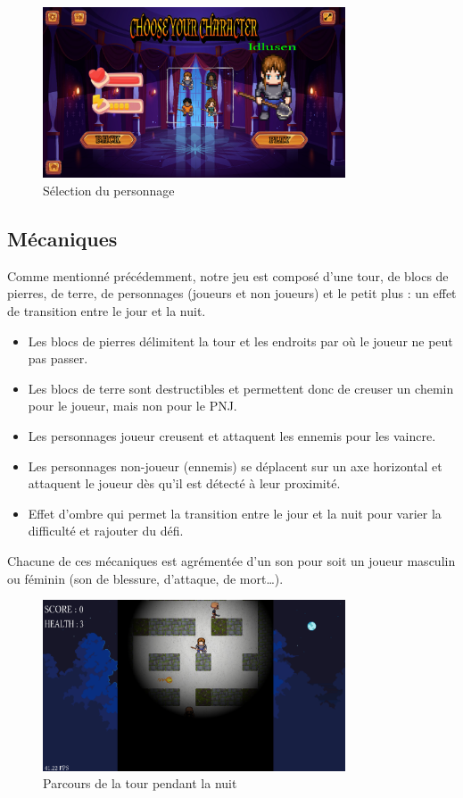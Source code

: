 \documentclass[a4paper,12pt]{article}
\begin{document}
\begin{figure}[H]
	\centering
	\includegraphics[width=0.8\textwidth]{img/ecran_selection.png}
	\caption{Sélection du personnage}
	\label{selection_personnage}
\end{figure}

\subsection{Mécaniques}
Comme mentionné précédemment, notre jeu est composé d'une tour, de blocs de pierres, de terre, de personnages (joueurs et non joueurs) et le petit plus : un effet de transition entre le jour et la nuit.
\begin{itemize}
	\item Les blocs de pierres délimitent la tour et les endroits par où le joueur ne peut pas passer.
	\item Les blocs de terre sont destructibles et permettent donc de creuser un chemin pour le joueur, mais non pour le PNJ.
	\item Les personnages joueur creusent et attaquent les ennemis pour les vaincre.
	\item Les personnages non-joueur (ennemis) se déplacent sur un axe horizontal et attaquent le joueur dès qu'il est détecté à leur proximité.
	\item Effet d'ombre qui permet la transition entre le jour et la nuit pour varier la difficulté et rajouter du défi.
\end{itemize}

Chacune de ces mécaniques est agrémentée d'un son pour soit un joueur masculin ou féminin (son de blessure, d'attaque, de mort\dots).

\begin{figure}[H]
	\centering
	\includegraphics[width=0.8\textwidth]{img/ecran_nuit.png}
	\caption{Parcours de la tour pendant la nuit}
	\label{tour_nuit}
\end{figure}
\end{document}
